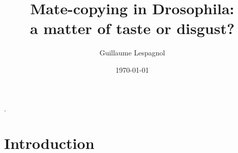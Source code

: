 \documentclass[a4paper, 12pt]{article}
\title{\Huge Mate-copying in Drosophila:\\ a matter of taste or disgust?}
\author{Guillaume Lespagnol}
\date{\today}
\begin{document}
	
	\maketitle
	
	\tableofcontents
	
	\bigskip
	
	
	\parencite[118]{danchin_cultural_2018}.
	\parencite{}
	
	
	
	
	\section{Introduction}
\end{document}
